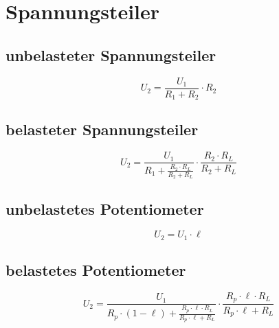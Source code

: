 



\section{Spannungsteiler}

\subsection{unbelasteter Spannungsteiler}
\[ U_2 = \frac{U_1}{R_1 + R_2} \cdot R_2 \]

\subsection{belasteter Spannungsteiler}
\[ U_2 = \frac{U_1}{R_1 + \frac{R_2 \cdot R_L}{R_2 + R_L}} \cdot \frac{R_2 \cdot R_L}{R_2 + R_L} \]

\subsection{unbelastetes Potentiometer}
\[ U_2 = U_1 \cdot \ell \]

\subsection{belastetes Potentiometer}
\[ U_2 = \frac{U_1}{R_p \cdot (1 - \ell) + \frac{R_p \cdot \ell \cdot R_L}{R_p \cdot \ell + R_L}} \cdot \frac{R_p \cdot \ell \cdot R_L}{R_p \cdot \ell + R_L} \]
